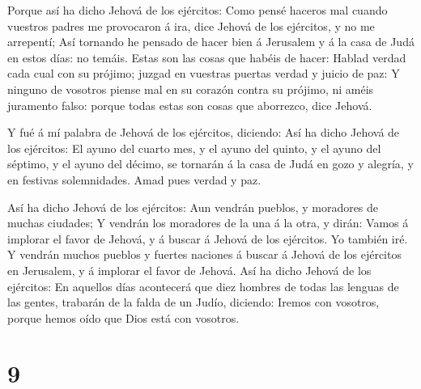  Porque así ha dicho Jehová de los ejércitos: Como pensé
haceros mal cuando vuestros padres me provocaron á ira, dice Jehová de
los ejércitos, y no me arrepentí;  Así tornando he pensado
de hacer bien á Jerusalem y á la casa de Judá en estos días: no temáis.
 Estas son las cosas que habéis de hacer: Hablad verdad
cada cual con su prójimo; juzgad en vuestras puertas verdad y juicio de
paz:  Y ninguno de vosotros piense mal en su corazón contra
su prójimo, ni améis juramento falso: porque todas estas son cosas que
aborrezco, dice Jehová.

 Y fué á mí palabra de Jehová de los ejércitos, diciendo:
 Así ha dicho Jehová de los ejércitos: El ayuno del cuarto
mes, y el ayuno del quinto, y el ayuno del séptimo, y el ayuno del
décimo, se tornarán á la casa de Judá en gozo y alegría, y en festivas
solemnidades. Amad pues verdad y paz.

 Así ha dicho Jehová de los ejércitos: Aun vendrán pueblos,
y moradores de muchas ciudades;  Y vendrán los moradores de
la una á la otra, y dirán: Vamos á implorar el favor de Jehová, y á
buscar á Jehová de los ejércitos. Yo también iré.  Y
vendrán muchos pueblos y fuertes naciones á buscar á Jehová de los
ejércitos en Jerusalem, y á implorar el favor de Jehová. 
Así ha dicho Jehová de los ejércitos: En aquellos días acontecerá que
diez hombres de todas las lenguas de las gentes, trabarán de la falda de
un Judío, diciendo: Iremos con vosotros, porque hemos oído que Dios está
con vosotros.

\hypertarget{section-8}{%
\section{9}\label{section-8}}

